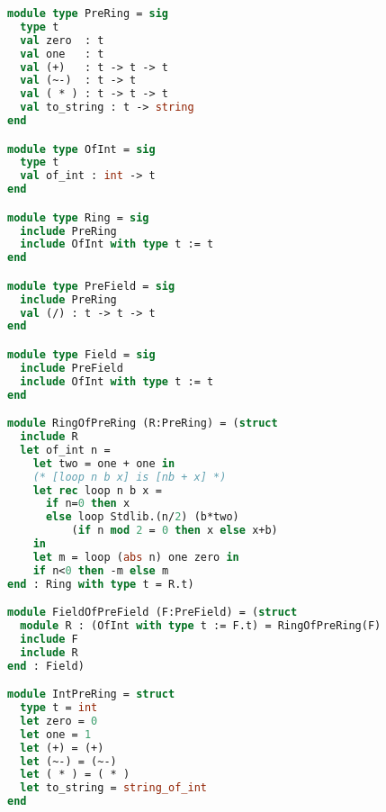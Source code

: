 \begin{lstlisting}[language=OCaml]
module type PreRing = sig
  type t
  val zero  : t
  val one   : t
  val (+)   : t -> t -> t
  val (~-)  : t -> t
  val ( * ) : t -> t -> t
  val to_string : t -> string
end

module type OfInt = sig
  type t
  val of_int : int -> t
end

module type Ring = sig
  include PreRing
  include OfInt with type t := t
end

module type PreField = sig
  include PreRing
  val (/) : t -> t -> t
end

module type Field = sig
  include PreField
  include OfInt with type t := t
end

module RingOfPreRing (R:PreRing) = (struct
  include R
  let of_int n =
    let two = one + one in
    (* [loop n b x] is [nb + x] *)
    let rec loop n b x =
      if n=0 then x
      else loop Stdlib.(n/2) (b*two)
          (if n mod 2 = 0 then x else x+b)
    in
    let m = loop (abs n) one zero in
    if n<0 then -m else m
end : Ring with type t = R.t)

module FieldOfPreField (F:PreField) = (struct
  module R : (OfInt with type t := F.t) = RingOfPreRing(F)
  include F
  include R
end : Field)

module IntPreRing = struct
  type t = int
  let zero = 0
  let one = 1
  let (+) = (+)
  let (~-) = (~-)
  let ( * ) = ( * )
  let to_string = string_of_int
end
\end{lstlisting}